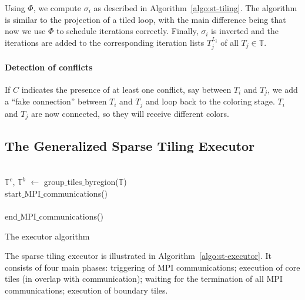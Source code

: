 Using $\Phi$, we compute $\sigma_i$ as described in Algorithm~\ref{algo:st-tiling}. The algorithm is similar to the projection of a tiled loop, with the main difference being that now we use $\Phi$ to schedule iterations correctly. Finally, $\sigma_i$ is inverted and the iterations are added to the corresponding iteration lists $T_j^{L_i}$ of all $T_j \in \mathbb{T}$. 


\paragraph{Detection of conflicts}
If $C$ indicates the presence of at least one conflict, say between $T_i$ and $T_j$, we add a ``fake connection'' between $T_i$ and $T_j$ and loop back to the coloring stage. $T_i$ and $T_j$ are now connected, so they will receive different colors. 



\subsection{The Generalized Sparse Tiling Executor}

\begin{algorithm}[t]
\nonl ~\\
$\mathbb{T}^{c}$, $\mathbb{T}^{b}$ $\gets$ group$\_$tiles$\_$byregion($\mathbb{T}$)\;
\nonl ~\\
start$\_$MPI$\_$communications()\;
\nonl ~\\
\nonl ~\\
end$\_$MPI$\_$communications()\;
\nonl ~\\
\caption{The executor algorithm}
\label{algo:st-executor}
\end{algorithm}


The sparse tiling executor is illustrated in Algorithm~\ref{algo:st-executor}. It consists of four main phases: triggering of MPI communications; execution of core tiles (in overlap with communication); waiting for the termination of all MPI communications; execution of boundary tiles.

